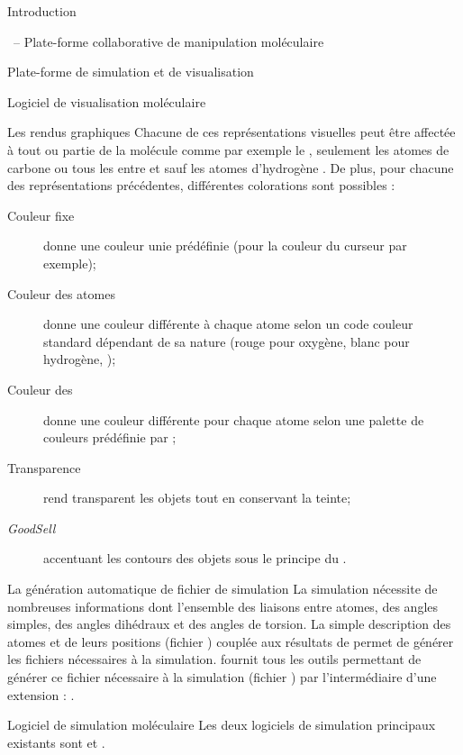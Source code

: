 \documentclass[myfrancais]{mythesis}
\begin{document}
\begin{mypart}{Introduction}
\begin{mychapter}{\myShaddock\ -- Plate-forme collaborative de manipulation moléculaire}
\begin{mysection}{Plate-forme de simulation et de visualisation}
\begin{mysubsection}{Logiciel de visualisation moléculaire}
\begin{mysubsubsection}{Les rendus graphiques}
						Chacune de ces représentations visuelles peut être affectée à tout ou partie de la molécule comme par exemple \og le   \fg, \og seulement les atomes de carbone \fg ou \og tous les  entre  et  sauf les atomes d'hydrogène \fg.
						De plus, pour chacune des représentations précédentes, différentes colorations sont possibles :
						\begin{description}
							\item[Couleur fixe] donne une couleur unie prédéfinie (pour la couleur du curseur par exemple);
							\item[Couleur des atomes] donne une couleur différente à chaque atome selon un code couleur standard dépendant de sa nature (rouge pour oxygène, blanc pour hydrogène, \myetc);
							\item[Couleur des ] donne une couleur différente pour chaque atome selon une palette de couleurs prédéfinie par ;
							\item[Transparence] rend transparent les objets tout en conservant la teinte;
							\item[\textit{GoodSell}] accentuant les contours des objets sous le principe du .
						\end{description}
					\end{mysubsubsection}
					\begin{mysubsubsection}{La génération automatique de fichier de simulation}
						La simulation nécessite de nombreuses informations dont l'ensemble des liaisons entre atomes, des angles simples, des angles dihédraux et des angles de torsion.
						La simple description des atomes et de leurs positions (fichier \myPDB) couplée aux résultats de \myCHARMM {} permet de générer les fichiers nécessaires à la simulation.
						 fournit tous les outils permettant de générer ce fichier nécessaire à la simulation (fichier \myPSF) par l'intermédiaire d'une extension : .
					\end{mysubsubsection}
				\end{mysubsection}
				\begin{mysubsection}{Logiciel de simulation moléculaire}
					Les deux logiciels de simulation principaux existants sont   et \myGromacs {}.

\end{mysubsection}
\end{mysection}
\end{mychapter}
\end{mypart}
\end{document}
